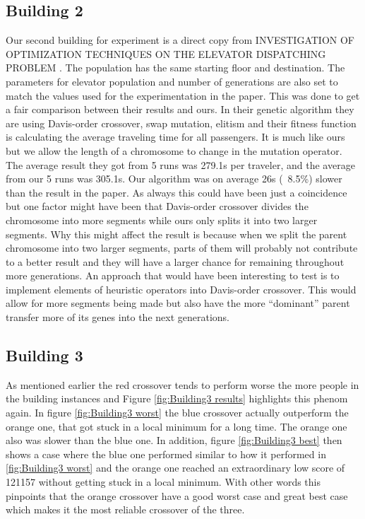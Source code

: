 \newpage

\subsection{Building 2}
Our second building for experiment is a direct copy from INVESTIGATION OF OPTIMIZATION TECHNIQUES ON THE ELEVATOR DISPATCHING PROBLEM \cite{gharieb2005optimal}. The population has the same starting floor and destination. The parameters for elevator population and number of generations are also set to match the values used for the experimentation in the paper. This was done to get a fair comparison between their results and ours. In their genetic algorithm they are using Davis-order crossover, swap mutation, elitism and their fitness function is calculating the average traveling time for all passengers. It is much like ours but we allow the length of a chromosome to change in the mutation operator. The average result they got from 5 runs was 279.1s per traveler, and the average from our 5 runs was 305.1s. Our algorithm was on average 26s (~8.5\%) slower than the result in the paper. As always this could have been just a coincidence but one factor might have been that Davis-order crossover divides the chromosome into more segments while ours only splits it into two larger segments. Why this might affect the result is because when we split the parent chromosome into two larger segments, parts of them will probably not contribute to a better result and they will have a larger chance for remaining throughout more generations. An approach that would have been interesting to test is to implement elements of heuristic operators into Davis-order crossover. This would allow for more segments being made but also have the more “dominant” parent transfer more of its genes into the next generations.

\newpage

\subsection{Building 3}
As mentioned earlier the red crossover tends to perform worse the more people in the building instances and Figure \ref{fig:Building3 results} highlights this phenom again. In figure \ref{fig:Building3 worst} the blue crossover actually outperform the orange one, that got stuck in a local minimum for a long time. The orange one also was slower than the blue one. In addition, figure \ref{fig:Building3 best} then shows a case where the blue one performed similar to how it performed in \ref{fig:Building3 worst} and the orange one reached an extraordinary low score of 121157 without getting stuck in a local minimum. With other words this pinpoints that the orange crossover have a good worst case and great best case which makes it the most reliable crossover of the three.

